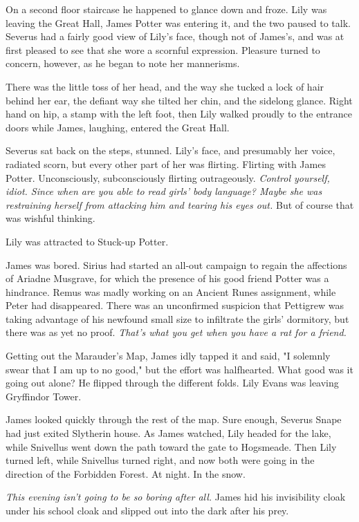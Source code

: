 \documentclass[a4paper,11pt]{article}
\begin{document}
On a second floor staircase he happened to glance down and froze. Lily was leaving the Great Hall, James Potter was entering it, and the two paused to talk. Severus had a fairly good view of Lily's face, though not of James's, and was at first pleased to see that she wore a scornful expression. Pleasure turned to concern, however, as he began to note her mannerisms.

There was the little toss of her head, and the way she tucked a lock of hair behind her ear, the defiant way she tilted her chin, and the sidelong glance. Right hand on hip, a stamp with the left foot, then Lily walked proudly to the entrance doors while James, laughing, entered the Great Hall.

Severus sat back on the steps, stunned. Lily's face, and presumably her voice, radiated scorn, but every other part of her was flirting. Flirting with James Potter. Unconsciously, subconsciously flirting outrageously. \emph{Control yourself, idiot. Since when are you able to read girls' body language? Maybe she was restraining herself from attacking him and tearing his eyes out.} But of course that was wishful thinking.

Lily was attracted to Stuck-up Potter.

James was bored. Sirius had started an all-out campaign to regain the affections of Ariadne Musgrave, for which the presence of his good friend Potter was a hindrance. Remus was madly working on an Ancient Runes assignment, while Peter had disappeared. There was an unconfirmed suspicion that Pettigrew was taking advantage of his newfound small size to infiltrate the girls' dormitory, but there was as yet no proof. \emph{That's what you get when you have a rat for a friend.}

Getting out the Marauder's Map, James idly tapped it and said, "I solemnly swear that I am up to no good," but the effort was halfhearted. What good was it going out alone? He flipped through the different folds. Lily Evans was leaving Gryffindor Tower.

James looked quickly through the rest of the map. Sure enough, Severus Snape had just exited Slytherin house. As James watched, Lily headed for the lake, while Snivellus went down the path toward the gate to Hogsmeade. Then Lily turned left, while Snivellus turned right, and now both were going in the direction of the Forbidden Forest. At night. In the snow.

\emph{This evening isn't going to be so boring after all.} James hid his invisibility cloak under his school cloak and slipped out into the dark after his prey.
\end{document}
